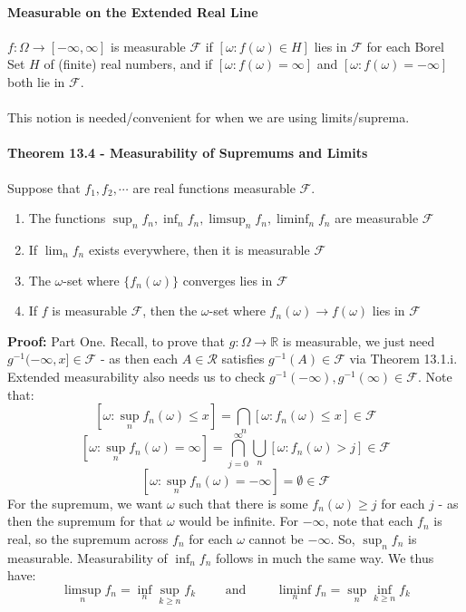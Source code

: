 \documentclass[12pt,a4paper]{article}
\newcommand{\1}[1]{\mathbbm{1}\left\{ #1 \right\}}
\newcommand{\R}{\mathbb{R}}
\newcommand{\fcal}{\mathcal{F}}
\newcommand{\rcal}{\mathcal{R}}
\begin{document}
\paragraph{Measurable on the Extended Real Line} $f : \Omega \to [-\infty,\infty]$ is measurable $\fcal$ if $[\omega : f(\omega) \in H]$ lies in $\fcal$ for each Borel Set $H$ of (finite) real numbers, and if $[\omega: f(\omega) = \infty]$ and $[\omega: f(\omega) = -\infty]$ both lie in $\fcal$.
\\\\
This notion is needed/convenient for when we are using limits/suprema.

\paragraph{Theorem 13.4 - Measurability of Supremums and Limits} Suppose that $f_1,f_2,\cdots$ are real functions measurable $\fcal$.
\begin{enumerate}
	\item The functions $\sup_n f_n, \inf_n f_n, \limsup_n f_n, \liminf_n f_n$ are measurable $\fcal$
	\item If $\lim_n f_n$ exists everywhere, then it is measurable $\fcal$
	\item The $\omega$-set where $\{f_n(\omega)\}$ converges lies in $\fcal$
	\item If $f$ is measurable $\fcal$, then the $\omega$-set where $f_n(\omega) \to f(\omega)$ lies in $\fcal$
\end{enumerate}
\textbf{Proof:} Part One. Recall, to prove that $g: \Omega \to \R$ is measurable, we just need $g^{-1}(-\infty,x] \in \fcal$ - as then each $A \in \rcal$ satisfies $g^{-1}(A) \in \fcal$ via Theorem 13.1.i. Extended measurability also needs us to check $g^{-1}(-\infty),g^{-1}(\infty) \in \fcal$. Note that:
$$
	\left[\omega : \sup_n f_n(\omega) \leq x\right] =
	\bigcap_n [\omega : f_n(\omega) \leq x] \in \fcal
$$
$$
	\left[\omega : \sup_n f_n(\omega) = \infty\right] =
	\bigcap_{j=0}^\infty \bigcup_n [\omega : f_n(\omega) > j] \in \fcal
$$
$$
	\left[\omega : \sup_n f_n(\omega) = -\infty\right] = \emptyset \in \fcal
$$
For the supremum, we want $\omega$ such that there is some $f_n(\omega) \geq j$ for each $j$ - as then the supremum for that $\omega$ would be infinite. For $-\infty$, note that each $f_n$ is real, so the supremum across $f_n$ for each $\omega$ cannot be $-\infty$. So, $\sup_n f_n$ is measurable. Measurability of $\inf_n f_n$ follows in much the same way. We thus have:
$$
	\limsup_n f_n = \inf_n \sup_{k \geq n} f_k
	\quad\quad\text{ and }\quad\quad
	\liminf_n f_n = \sup_n \inf_{k \geq n} f_k
$$
\end{document}
